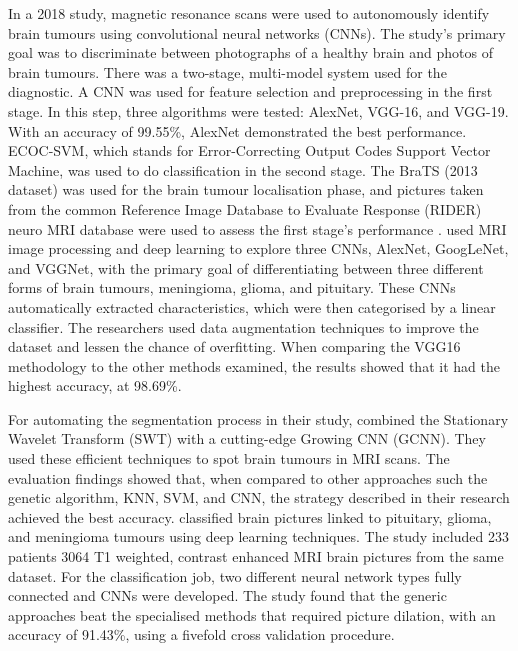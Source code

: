 \documentclass[12pt, a4paper,twoside]{report}
\theoremstyle{plain} %
\theoremstyle{definition} %
\theoremstyle{remark} %
\numberwithin{equation}{chapter}
\begin{document}
In a 2018 study, magnetic resonance scans were used to autonomously identify brain tumours using convolutional neural networks (CNNs). The study's primary goal was to discriminate between photographs of a healthy brain and photos of brain tumours. There was a two-stage, multi-model system used for the diagnostic. A CNN was used for feature selection and preprocessing in the first stage. In this step, three algorithms were tested: AlexNet, VGG-16, and VGG-19. With an accuracy of 99.55\%, AlexNet demonstrated the best performance. ECOC-SVM, which stands for Error-Correcting Output Codes Support Vector Machine, was used to do classification in the second stage. The BraTS (2013 dataset) was used for the brain tumour localisation phase, and pictures taken from the common Reference Image Database to Evaluate Response (RIDER) neuro MRI database were used to assess the first stage's performance \cite{abd18}. \cite{rehman20} used MRI image processing and deep learning to explore three CNNs, AlexNet, GoogLeNet, and VGGNet, with the primary goal of differentiating between three different forms of brain tumours, meningioma, glioma, and pituitary. These CNNs automatically extracted characteristics, which were then categorised by a linear classifier. The researchers used data augmentation techniques to improve the dataset and lessen the chance of overfitting. When comparing the VGG16 methodology to the other methods examined, the results showed that it had the highest accuracy, at 98.69\%.

For automating the segmentation process in their study, \cite{mittal19} combined the Stationary Wavelet Transform (SWT) with a cutting-edge Growing CNN (GCNN). They used these efficient techniques to spot brain tumours in MRI scans. The evaluation findings showed that, when compared to other approaches such the genetic algorithm, KNN, SVM, and CNN, the strategy described in their research achieved the best accuracy. \cite{paul17} classified brain pictures linked to pituitary, glioma, and meningioma tumours using deep learning techniques. The study included 233 patients 3064 T1 weighted, contrast enhanced MRI brain pictures from the same dataset. For the classification job, two different neural network types fully connected and CNNs were developed. The study found that the generic approaches beat the specialised methods that required picture dilation, with an accuracy of 91.43\%, using a fivefold cross validation procedure.
\end{document}
